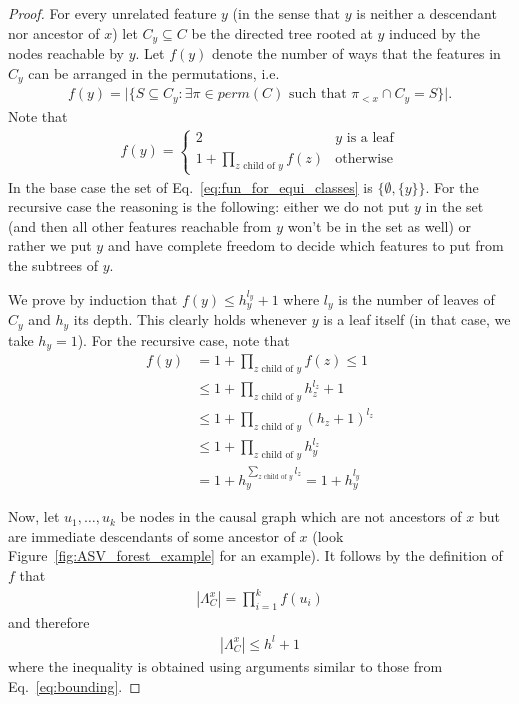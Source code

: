 \documentclass{llncs}
\begin{document}
\begin{proof}
	For every unrelated feature $y$ (in the sense that $y$ is neither a descendant nor ancestor of $x$) let $C_y \subseteq C$ be the directed tree rooted at $y$ induced by the nodes reachable by $y$. Let $f(y)$ denote the number of ways that the features in $C_y$ can be arranged in the permutations, i.e. 
	\begin{align}\label{eq:f}
		f(y) = \big| \{S \subseteq C_y : \exists \pi \in perm(C) \text{ such that } \pi_{<x} \cap C_y = S\} \big|.
	\end{align}
	Note that
	\begin{align}\label{eq:fun_for_equi_classes}
		f(y) = \begin{cases}
			2 & y \text{ is a leaf}\\
			1 + \prod_{z \text{ child of } y} f(z) & \text{otherwise}
		\end{cases}
	\end{align}
	In the base case the set of Eq.~\eqref{eq:fun_for_equi_classes} is $\{\emptyset, \{y\}\}$. For the recursive case the reasoning is the following: either we do not put $y$ in the set (and then all other features reachable from $y$ won't be in the set as well) or rather 
	we put $y$ and have complete freedom to decide which features to put from the subtrees of $y$.

	We prove by induction that $f(y) \leq h_y^{l_y} + 1$ where $l_y$ is the number of leaves of $C_y$ and $h_y$ its depth. This clearly holds whenever $y$ is a leaf itself (in that case, we take $h_y = 1$). For the recursive case, note that
	\begin{align}\label{eq:bounding}
		f(y) &= 1 + \prod_{z \text{ child of } y} f(z) \leq 1\\
		&\leq 1 + \prod_{z \text{ child of } y} h_z^{l_z} + 1\nonumber\\
		&\leq 1 + \prod_{z \text{ child of } y} (h_z+1)^{l_z}\nonumber\\
		&\leq 1 + \prod_{z \text{ child of } y} h_y^{l_z}\nonumber\\
		&= 1 + h_y^{\sum_{z \text{ child of } y} l_z} = 1 + h_y^{l_y}\nonumber
	\end{align}

	Now, let $u_1,\ldots,u_k$ be nodes in the causal graph which are not ancestors of $x$ but are immediate descendants of some ancestor of $x$ (look Figure~\ref{fig:ASV_forest_example} for an example). It follows by the definition of $f$ that
	\begin{align}\label{eq:Lambda}
		|\Lambda_C^x| = \prod_{i=1}^k f(u_i)
	\end{align}
	and therefore
	\begin{align*}
		|\Lambda_C^x| \leq h^l + 1
	\end{align*}
	where the inequality is obtained using arguments similar to those from Eq.~\eqref{eq:bounding}.
\end{proof}
\end{document}
